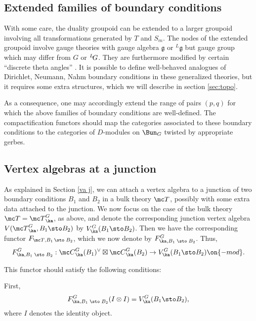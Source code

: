 \documentclass[11pt,reqno]{amsart}
\theoremstyle{plain}
\numberwithin{equation}{section}
\def\neg{\negthinspace}
\def\LG{{}^L\neg G}
\theoremstyle{definition}
\begin{document}
\subsection{Extended families of boundary conditions}

With some care, the duality groupoid can be extended to a larger
groupoid involving all transformations generated by $T$ and $S_m$. 
The nodes of the extended groupoid involve gauge theories 
with gauge algebra $\mathfrak{g}$ or ${}^L\mathfrak{g}$
but gauge group which may differ from $G$ or $\LG$.
They are furthermore modified by certain ``discrete theta angles'' \cite{AST}. 
It is possible to define well-behaved analogues
of Dirichlet, Neumann, Nahm boundary conditions in these generalized
theories, but it requires some extra structures, which we will
describe in section \ref{sec:topo}.

As a consequence, one may accordingly extend the range of pairs $(p,q)$ 
for which the above families of boundary conditions are
well-defined. The compactification functors should map the categories
associated to these boundary conditions to the categories of
$D$-modules on $\Bun_G$ twisted by appropriate gerbes.

\subsection{Vertex algebras at a junction}    \label{va junction}

As explained in Section \ref{va j}, we can attach a vertex algebra to
a junction of two boundary conditions $B_1$ and $B_2$ in a bulk theory
${\mc T}$, possibly with some extra data attached to the junction. We
now focus on the case of the bulk theory ${\mc T}={\mc T}^G_\ka$, as
above, and denote the corresponding junction vertex algebra $V({\mc
  T}^G_\ka,B_1\sto B_2)$ by $V^G_\ka(B_1\sto B_2)$. Then we have the
corresponding functor $F_{{\mc T},B_1\, \sto \; B_2}$, which we now
denote by $F^G_{\ka,B_1\; \sto \; B_2}$. Thus,
\begin{equation}    \label{box}
F^G_{\ka,B_1\; \sto \; B_2}: {\mc C}^G_\ka(B_1)^\vee \boxtimes {\mc
  C}^G_\ka(B_2) \to V^G_\ka(B_1\sto B_2)\on{-mod}.
\end{equation}

This functor should satisfy the following conditions:

First,
\begin{equation}    \label{II}
F^G_{\ka,B_1\; \sto \; B_2}(I \otimes I) = V^G_\ka(B_1\sto B_2),
\end{equation}
where $I$ denotes the identity object.
\end{document}
